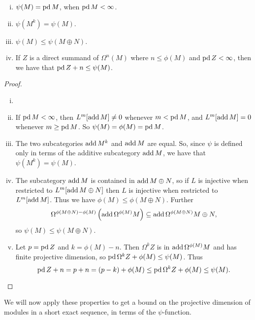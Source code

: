 \begin{lemma} \cite[Lemma~3]{IgTo05} \label{lem:properties_of_psi}
	\begin{enumerate}[i)]
		\item $\psi(M) = \operatorname{pd} M$, when $\operatorname{pd} M < \infty$.
		\item $\psi(M^k) = \psi(M)$.
		\item $\psi(M) \leq \psi(M\oplus N)$.
		\item If $Z$ is a direct summand of $\Omega^n(M)$ where $n \leq \phi(M)$ and $\operatorname{pd} Z < \infty$, then we have that $\operatorname{pd} Z + n \leq \psi(M)$.
	\end{enumerate}
	\begin{proof}
		\begin{enumerate}[i)]
			\item[] %
			\item If $\operatorname{pd} M < \infty$, then $L^m[\operatorname{add} M] \neq 0$ whenever $m < \operatorname{pd} M$, and $L^m[\operatorname{add} M] =0$ whenever $m \geq \operatorname{pd} M$. So $\psi(M)=\phi(M)=\operatorname{pd} M$.
			\item The two subcategories $\operatorname{add} M^k$ and $\operatorname{add} M$ are equal. So, since $\psi$ is defined only in terms of the additive subcategory $\operatorname{add} M$, we have that $\psi(M^k)=\psi(M)$.
			\item  The subcategory $\operatorname{add} M$ is contained in $\operatorname{add} M\oplus N$, so if $L$ is injective when restricted to $L^m[\operatorname{add} M\oplus N]$ then $L$ is injective when restricted to $L^m[\operatorname{add} M]$. Thus we have $\phi(M) \leq \phi({M\oplus N})$. Further $$\Omega^{\phi({M\oplus N})-\phi(M)}\left(\operatorname{add}\Omega^{\phi(M)}M \right) \subseteq \operatorname{add}\Omega^{\phi({M\oplus N})} M\oplus N,$$ 
			so $\psi(M) \leq \psi(M\oplus N)$.
			\item Let $p=\operatorname{pd} Z$ and $k = \phi(M) - n$. Then $\Omega^k Z$ is in $\operatorname{add} \Omega^{\phi(M)}M$ and has finite projective dimension, so $\operatorname{pd}\Omega^k Z + \phi(M) \leq \psi(M)$. Thus $$\operatorname{pd} Z + n = p + n = (p-k) + \phi(M) \leq \operatorname{pd}\Omega^k Z + \phi(M) \leq \psi(M).$$
		\end{enumerate}
	\end{proof}
\end{lemma}

We will now apply these properties to get a bound on the projective dimension of modules in a short exact sequence, in terms of the $\psi$-function.

